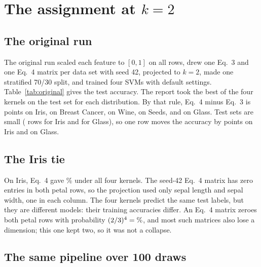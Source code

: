 \section{The assignment at $k = 2$}
\label{sec:assignment}

\subsection{The original run}

The original run scaled each feature to $[0, 1]$ on all rows, drew one Eq.~3 and one Eq.~4 matrix per data set with seed 42, projected to $k = 2$, made one stratified 70/30 split, and trained four SVMs with default settings. Table~\ref{tab:original} gives the test accuracy. The report took the best of the four kernels on the test set for each distribution. By that rule, Eq.~4 minus Eq.~3 is  points on Iris,  on Breast Cancer,  on Wine,  on Seeds, and  on Glass. Test sets are small ( rows for Iris and  for Glass), so one row moves the accuracy by  points on Iris and  on Glass.

\begin{table}[t]
\caption{Test accuracy (\%, plain accuracy for every data set) of the original run: one matrix per distribution, one split, default SVMs, $k = 2$. Lin.: linear; P2, P3: polynomial of degree 2 and 3.}
\label{tab:original}
\centering
\footnotesize
\setlength{\tabcolsep}{4pt}

\end{table}

\subsection{The Iris tie}

On Iris, Eq.~4 gave \% under all four kernels. The seed-42 Eq.~4 matrix has zero entries in both petal rows, so the projection used only sepal length and sepal width, one in each column. The four kernels predict the same  test labels, but they are different models: their training accuracies differ. An Eq.~4 matrix zeroes both petal rows with probability $(2/3)^4 = \N{z:theory_both_iris}\%$, and most such matrices also lose a dimension; this one kept two, so it was not a collapse.

\subsection{The same pipeline over 100 draws}

